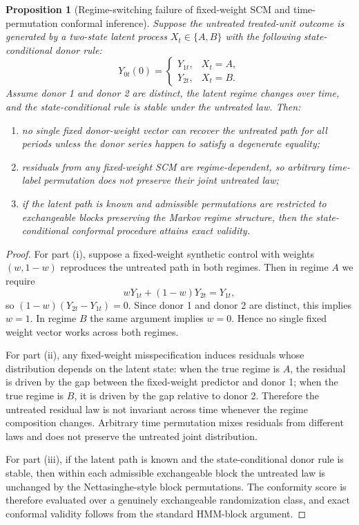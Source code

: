 \documentclass[11pt]{article}
\newtheorem{proposition}{Proposition}
\begin{document}
\begin{proposition}[Regime-switching failure of fixed-weight SCM and time-permutation conformal inference]
Suppose the untreated treated-unit outcome is generated by a two-state latent process $X_t \in \{A,B\}$ with the following state-conditional donor rule:
\[
Y_{0t}(0)=
\begin{cases}
Y_{1t}, & X_t=A,\\
Y_{2t}, & X_t=B.
\end{cases}
\]
Assume donor 1 and donor 2 are distinct, the latent regime changes over time, and the state-conditional rule is stable under the untreated law. Then:

\begin{enumerate}[label=(\roman*)]
    \item no single fixed donor-weight vector can recover the untreated path for all periods unless the donor series happen to satisfy a degenerate equality;
    \item residuals from any fixed-weight SCM are regime-dependent, so arbitrary time-label permutation does not preserve their joint untreated law;
    \item if the latent path is known and admissible permutations are restricted to exchangeable blocks preserving the Markov regime structure, then the state-conditional conformal procedure attains exact validity.
\end{enumerate}
\end{proposition}

\begin{proof}
For part (i), suppose a fixed-weight synthetic control with weights $(w,1-w)$ reproduces the untreated path in both regimes. Then in regime $A$ we require
\[
wY_{1t}+(1-w)Y_{2t}=Y_{1t},
\]
so $(1-w)(Y_{2t}-Y_{1t})=0$. Since donor 1 and donor 2 are distinct, this implies $w=1$. In regime $B$ the same argument implies $w=0$. Hence no single fixed weight vector works across both regimes.

For part (ii), any fixed-weight misspecification induces residuals whose distribution depends on the latent state: when the true regime is $A$, the residual is driven by the gap between the fixed-weight predictor and donor 1; when the true regime is $B$, it is driven by the gap relative to donor 2. Therefore the untreated residual law is not invariant across time whenever the regime composition changes. Arbitrary time permutation mixes residuals from different laws and does not preserve the untreated joint distribution.

For part (iii), if the latent path is known and the state-conditional donor rule is stable, then within each admissible exchangeable block the untreated law is unchanged by the Nettasinghe-style block permutations. The conformity score is therefore evaluated over a genuinely exchangeable randomization class, and exact conformal validity follows from the standard HMM-block argument.
\end{proof}
\end{document}
